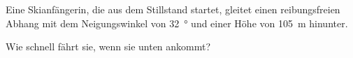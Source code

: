 \begin{aufgabe}

Eine Skianfängerin, die aus dem Stillstand startet, gleitet einen reibungsfreien Abhang mit dem Neigungswinkel von \SI{32}{\degree}
und einer Höhe von \SI{105}{m} hinunter.

Wie schnell fährt sie, wenn sie unten ankommt?


\end{aufgabe}
